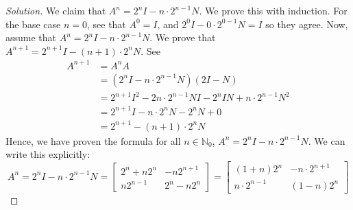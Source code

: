 \documentclass{article}
\newcommand{\N}{{\mathbb N}}
\begin{document}
\begin{enumerate}
\begin{proof}[Solution]
		We claim that $A^n = 2^nI - n\cdot 2^{n-1}N$.
		We prove this with induction.
		For the base case $n = 0$, see that
		$A^0 = I$, and $2^0I - 0\cdot 2^{0-1}N = I$ so they agree.
		Now, assume that $A^n = 2^nI - n\cdot 2^{n-1}N$.
		We prove that $A^{n+1} = 2^{n+1}I - (n+1)\cdot 2^nN$. See
		\begin{align*}
			A^{n+1} &= A^nA\\
					&= (2^nI - n\cdot 2^{n-1}N)(2I - N)\\
					&= 2^{n+1}I^2 - 2n\cdot2^{n-1}NI - 2^nIN
					+ n\cdot 2^{n-1}N^2\\
					&= 2^{n+1}I - n\cdot 2^nN - 2^nN + 0\\
					&= 2^{n+1} - (n+1)\cdot2^nN
		\end{align*}
		Hence, we have proven the formula for all $n \in \N_0$, $A^n = 2^nI - n\cdot 2^{n-1}N$.
		We can write this explicitly:
		\[
			A^n = 2^nI - n\cdot 2^{n-1}N =
			\begin{bmatrix} 2^n + n2^n & -n2^{n+1} \\ n2^{n-1} & 2^n - n2^n\end{bmatrix}
			= \begin{bmatrix} (1+n)2^n & -n\cdot 2^{n+1} \\ n \cdot 2^{n-1} & (1-n)2^n \end{bmatrix}
		\]
		

\end{proof}
\end{enumerate}
\end{document}
